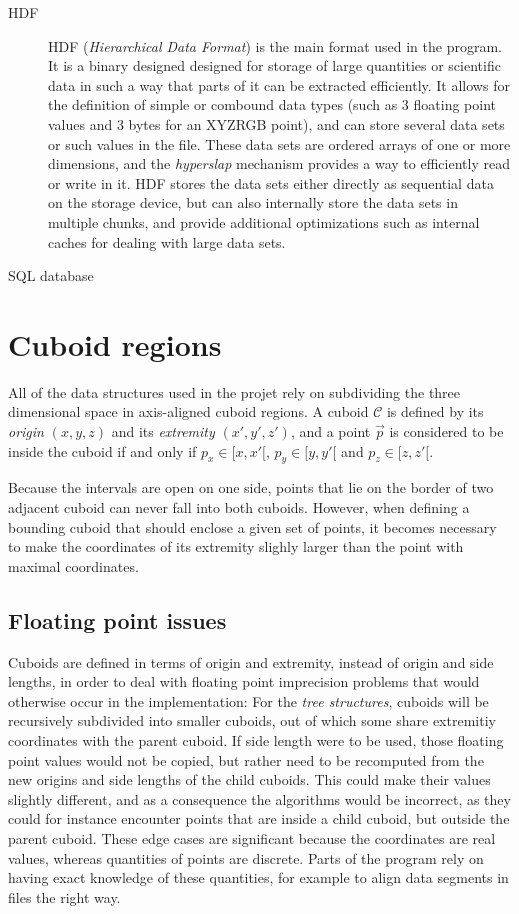 \documentclass[a4paper,10pt,abstracton,notitlepage]{scrreprt}
\begin{document}
\begin{description}
\item[HDF] HDF (\emph{Hierarchical Data Format}) is the main format used in the program. It is a binary designed designed for storage of large quantities or scientific data in such a way that parts of it can be extracted efficiently. It allows for the definition of simple or combound data types (such as 3 floating point values and 3 bytes for an XYZRGB point), and can store several data sets or such values in the file. These data sets are ordered arrays of one or more dimensions, and the \emph{hyperslap} mechanism provides a way to efficiently read or write in it. HDF stores the data sets either directly as sequential data on the storage device, but can also internally store the data sets in multiple chunks, and provide additional optimizations such as internal caches for dealing with large data sets.
\item[SQL database] 
\end{description}

\section{Cuboid regions} \label{sec:cub_reg}
All of the data structures used in the projet rely on subdividing the three dimensional space in axis-aligned cuboid regions. A cuboid $\mathcal{C}$ is defined by its \emph{origin} $(x, y, z)$ and its \emph{extremity} $(x', y', z')$, and a point $\overrightarrow{p}$ is considered to be inside the cuboid if and only if $p_{x} \in [x, x'[$, $p_{y} \in [y, y'[$ and $p_{z} \in [z, z'[$.

Because the intervals are open on one side, points that lie on the border of two adjacent cuboid can never fall into both cuboids. However, when defining a bounding cuboid that should enclose a given set of points, it becomes necessary to make the coordinates of its extremity slighly larger than the point with maximal coordinates.

\subsection{Floating point issues}
Cuboids are defined in terms of origin and extremity, instead of origin and side lengths, in order to deal with floating point imprecision problems that would otherwise occur in the implementation: For the \emph{tree structures}, cuboids will be recursively subdivided into smaller cuboids, out of which some share extremitiy coordinates with the parent cuboid. If side length were to be used, those floating point values would not be copied, but rather need to be recomputed from the new origins and side lengths of the child cuboids. This could make their values slightly different, and as a consequence the algorithms would be incorrect, as they could for instance encounter points that are inside a child cuboid, but outside the parent cuboid.
These edge cases are significant because the coordinates are real values, whereas quantities of points are discrete. Parts of the program rely on having exact knowledge of these quantities, for example to align data segments in files the right way.
\end{document}

